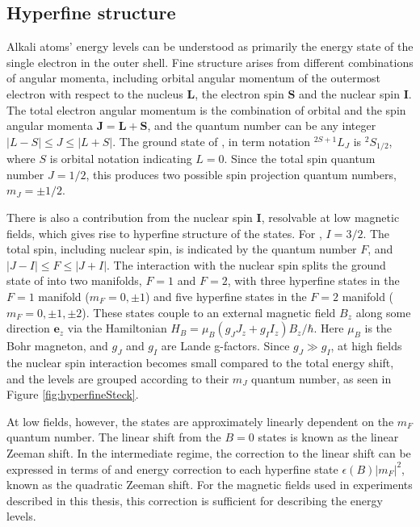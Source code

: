 \subsection{Hyperfine structure}
	Alkali atoms' energy levels can be understood as primarily the energy state of the single electron in the outer shell. Fine structure arises from different combinations of angular momenta, including orbital angular momentum of the outermost electron with respect to the nucleus $\mathbf{L}$, the electron spin $\mathbf{S}$ and the nuclear spin $\mathbf{I}$. The total electron angular momentum is the combination of orbital and the spin angular momenta $\mathbf{J} = \mathbf{L} +\mathbf{S}$, and the quantum number can be any integer $|L - S| \leq J \leq |L + S|$. The ground state of \Rb{}, in term notation $^{2S+1}L_J$ is $^2S_{1/2}$, where $S$ is orbital notation indicating $L=0$. Since the total spin quantum number $J=1/2$, this produces two possible spin projection quantum numbers, $m_J=\pm1/2$.

	There is also a contribution from the nuclear spin $\mathbf{I}$, resolvable at low magnetic fields, which gives rise to hyperfine structure of the states. For \Rb{}, $I=3/2$. The total spin, including nuclear spin, is indicated by the quantum number $F$, and $|J - I| \leq F \leq |J + I|$. The interaction with the nuclear spin splits the ground state of \Rb{} into two manifolds, $F=1$ and $F=2$, with three hyperfine states in the $F=1$ manifold ($m_F=0,\pm1$) and five hyperfine states in the $F=2$ manifold ($m_F=0,\pm1,\pm2$). These states couple to an external magnetic field $B_z$ along some direction $\mathbf{e}_z$ via the Hamiltonian $H_B=\mu_B(g_JJ_z+g_II_z)B_z/\hbar$. Here $\mu_B$ is the Bohr magneton, and $g_J$ and $g_I$ are Lande g-factors. Since $g_J\gg g_I$, at high fields the nuclear spin interaction becomes small compared to the total energy shift, and the levels are grouped according to their $m_J$ quantum number, as seen in Figure \ref{fig:hyperfineSteck}.

At low fields, however, the states are approximately linearly dependent on the $m_F$ quantum number. The linear shift from the $B=0$ states is known as the linear Zeeman shift. In the intermediate regime, the correction to the linear shift can be expressed in terms of and energy correction to each hyperfine state $\epsilon(B)|m_F|^2$, known as the quadratic Zeeman shift. For the magnetic fields used in experiments described in this thesis, this correction is sufficient for describing the energy levels. 

